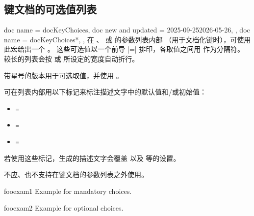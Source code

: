 \clearpage
\subsection{键文档的可选值列表}

\enlargethispage*{10mm}
\begin{docCommands}[doc parameter=\marg{comma separated list of choices}]
  {
    {
      doc name = docKeyChoices,
      doc new and updated = {2025-09-25}{2026-05-26},
    },
    {
      doc name = docKeyChoices*,
    },
  }
  在 、 或  的参数列表内部
  （用于文档化键时），可使用此宏给出一个
  。
  这些可选值以一个前导 |=| 排印，各取值之间用
   作为分隔符。
  较长的列表会按  或
   所设定的宽度自动折行。\par
  带星号的版本用于可选取值，并使用 。\par
  可在列表内部用以下标记来标注描述文字中的默认值和/或初始值：
  \begin{itemize}
  \item{}\texttt{=}
  \item{}\texttt{=}
  \item{}\texttt{=}
  \end{itemize}
  若使用这些标记，生成的描述文字会覆盖 
  以及  等的设置。
  \begin{marker}
   不应、也不支持在键文档的参数列表之外使用。
  \end{marker}
\begin{dispExample}
\begin{docKey}[foo]{fooexam1}{}{}
  Example for mandatory choices.
\end{docKey}
\end{dispExample}
\begin{dispExample}
\begin{docKey}[foo]{fooexam2}{}{}
  Example for optional choices.
\end{docKey}
\end{dispExample}

\end{docCommands}
